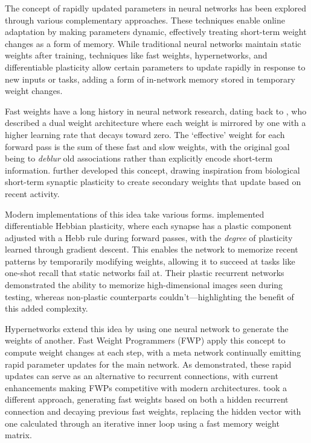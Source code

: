 \documentclass{article} %
\begin{document}
The concept of rapidly updated parameters in neural networks has been explored through various complementary approaches. These techniques enable online adaptation by making parameters dynamic, effectively treating short-term weight changes as a form of memory. While traditional neural networks maintain static weights after training, techniques like fast weights, hypernetworks, and differentiable plasticity allow certain parameters to update rapidly in response to new inputs or tasks, adding a form of in-network memory stored in temporary weight changes.

Fast weights have a long history in neural network research, dating back to \citet{hintonUsingFastWeights1987}, who described a dual weight architecture where each weight is mirrored by one with a higher learning rate that decays toward zero. The `effective' weight for each forward pass is the sum of these fast and slow weights, with the original goal being to \emph{deblur} old associations rather than explicitly encode short-term information. \citet{schmidhuberLearningControlFastweight1992} further developed this concept, drawing inspiration from biological short-term synaptic plasticity to create secondary weights that update based on recent activity.

Modern implementations of this idea take various forms. \citet{miconiDifferentiablePlasticityTraining2018a} implemented differentiable Hebbian plasticity, where each synapse has a plastic component adjusted with a Hebb rule during forward passes, with the \emph{degree} of plasticity learned through gradient descent. This enables the network to memorize recent patterns by temporarily modifying weights, allowing it to succeed at tasks like one-shot recall that static networks fail at. Their plastic recurrent networks demonstrated the ability to memorize high-dimensional images seen during testing, whereas non-plastic counterparts couldn't—highlighting the benefit of this added complexity.

Hypernetworks extend this idea by using one neural network to generate the weights of another. Fast Weight Programmers (FWP) apply this concept to compute weight changes at each step, with a meta network continually emitting rapid parameter updates for the main network. As  \citet{irieGoingLinearTransformers2021a} demonstrated, these rapid updates can serve as an alternative to recurrent connections, with current enhancements making FWPs competitive with modern architectures. \citet{baUsingFastWeights2016} took a different approach, generating fast weights based on both a hidden recurrent connection and decaying previous fast weights, replacing the hidden vector with one calculated through an iterative inner loop using a fast memory weight matrix.
\end{document}
